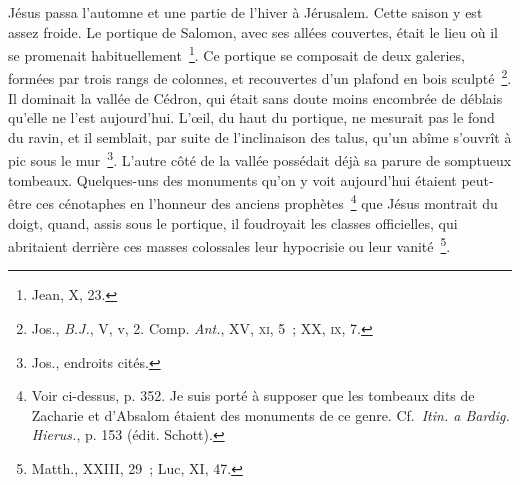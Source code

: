 \documentclass[french,twoside]{book} %
\newcommand\chaptercont{} %
\begin{document}
\chaptercont
\noindent Jésus passa l’automne et une partie de l’hiver à Jérusalem. Cette saison y est assez froide. Le portique de Salomon, avec ses allées couvertes, était le lieu où il se promenait habituellement \footnote{Jean, X, 23.}. Ce portique se composait de deux galeries, formées par trois rangs de colonnes, et recouvertes d’un plafond en bois sculpté \footnote{ Jos., {\itshape B.J.}, V, v, 2. Comp. {\itshape Ant.}, XV, \textsc{xi}, 5 ; XX, \textsc{ix}, 7.}. Il dominait la vallée de Cédron, qui était sans doute moins encombrée de déblais qu’elle ne l’est aujourd’hui. L’œil, du haut du portique, ne mesurait pas le fond du ravin, et il semblait, par suite de l’inclinaison des talus, qu’un abîme s’ouvrît à pic sous le mur \footnote{Jos., endroits cités.}. L’autre côté de la vallée possédait déjà sa parure de somptueux tombeaux. Quelques-uns des monuments qu’on y voit aujourd’hui étaient peut-être ces cénotaphes en l’honneur des anciens prophètes \footnote{ Voir ci-dessus, p. 352. Je suis porté à supposer que les tombeaux dits de Zacharie et d’Absalom étaient des monuments de ce genre. Cf. {\itshape Itin. a Bardig. Hierus.}, p. 153 (édit. Schott).} que Jésus montrait du doigt, quand, assis sous le portique, il foudroyait les classes officielles, qui abritaient derrière ces masses colossales leur hypocrisie ou leur vanité \footnote{Matth., XXIII, 29 ; Luc, XI, 47.}.\par
\end{document}
